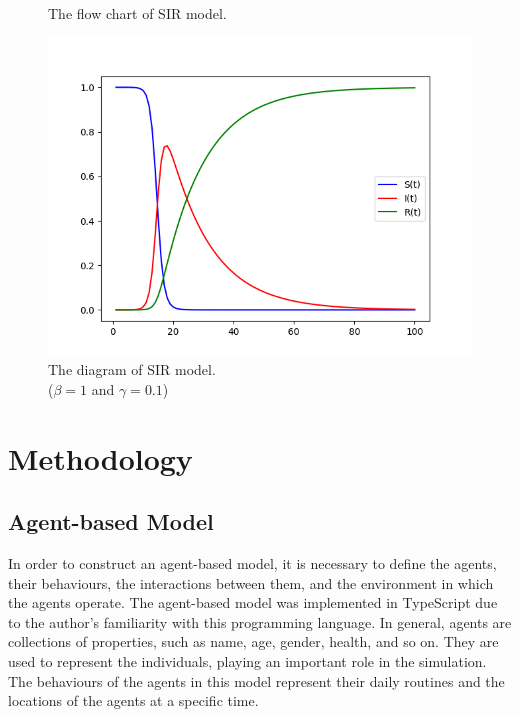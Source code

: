 \documentclass[12pt]{article}
\begin{document}
\begin{figure}[h]
	\begin{minipage}[h]{0.3\linewidth}
		\centering
		
        \caption{\scriptsize \sffamily The flow chart\textcite{mediumGeneral} of SIR model. }
	\end{minipage}
	\begin{minipage}[h]{0.7\linewidth}
		\centering
		\includegraphics[width=\linewidth]{./assets/sir-graph.png}
         \caption{\scriptsize \sffamily The diagram\textcite{sirGraph} of SIR model. \\ \quad($\beta=1$ and $\gamma=0.1$)}
	\end{minipage}
	\label{fig:hor_2figs_1cap}
\end{figure}

\section{Methodology}

\subsection{Agent-based Model}
In order to construct an agent-based model, it is necessary to define the agents, their behaviours, the interactions between them, and the environment in which the agents operate. 
The agent-based model was implemented in TypeScript due to the author's familiarity with this programming language.
In general, agents are collections of properties, such as name, age, gender, health, and so on. They are used to represent the individuals, playing an important role in the simulation.
The behaviours of the agents in this model represent their daily routines and the locations of the agents at a specific time.
\end{document}
